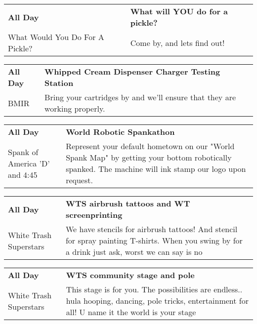 \begin{tabular}{ p{1in} p{2.2in} }
    \textbf{All Day} & \textbf{What will YOU do for a pickle?} \\
    What Would You Do For A Pickle? \newline  & Come by, and lets find out! \\
    \hline 
\end{tabular}
    
\begin{tabular}{ p{1in} p{2.2in} }
    \textbf{All Day} & \textbf{Whipped Cream Dispenser Charger Testing Station} \\
    BMIR \newline  & Bring your cartridges by and we'll ensure that they are working properly. \\
    \hline 
\end{tabular}
    
\begin{tabular}{ p{1in} p{2.2in} }
    \textbf{All Day} & \textbf{World Robotic Spankathon} \\
    Spank of America \newline 'D' and 4:45 & Represent your default hometown on our "World Spank Map" by getting your bottom robotically spanked. The machine will ink stamp our logo upon request. \\
    \hline 
\end{tabular}
    
\begin{tabular}{ p{1in} p{2.2in} }
    \textbf{All Day} & \textbf{WTS airbrush tattoos and WT screenprinting} \\
    White Trash Superstars \newline  & We have stencils for airbrush tattoos! And stencil for spray painting T-shirts. When you swing by for a drink just ask, worst we can say is no \\
    \hline 
\end{tabular}
    
\begin{tabular}{ p{1in} p{2.2in} }
    \textbf{All Day} & \textbf{WTS community stage and pole} \\
    White Trash Superstars \newline  & This stage is for you. The possibilities are endless.. hula hooping,  dancing, pole tricks, entertainment for all! U name it the world is your stage \\
    \hline 
\end{tabular}
    
